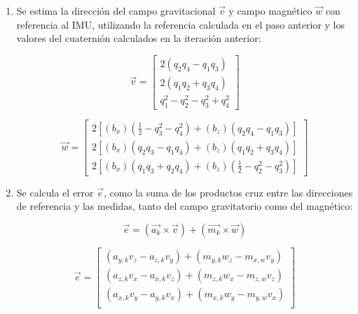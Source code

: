 \begin{enumerate}
        \item Se estima la dirección del campo gravitacional \textbf{\textit{$\vec{v}$}} y campo magnético \textbf{\textit{$\vec{w}$}} con referencia al IMU, utilizando la referencia calculada en el paso anterior y los valores del cuaternión calculados en la iteración anterior:
        
        \begin{equation}        
            \vec{v} = 
                \begin{bmatrix}
                    2(q_2q_4 - q_1q_3) \\
                    2(q_1q_2 + q_3q_4) \\
                    q^2_1 - q^2_2 - q^2_3 +q^2_4  
                \end{bmatrix} 
        \end{equation}

        \begin{equation}        
            \vec{w} = 
                \begin{bmatrix}
                    2[(b_x)(\frac{1}{2} - q^2_3 - q^2_4) + (b_z)(q_2q_4 - q_1q_3)] \\
                    2[(b_x)(q_2q_3 - q_1q_4) + (b_z)(q_1q_2 + q_3q_4)] \\
                    2[(b_x)(q_1q_3 + q_2q_4) + (b_z)(\frac{1}{2} - q^2_2 - q^2_3)] 
                \end{bmatrix} 
        \end{equation}

        \item Se calcula el error $\vec{e}$, como la suma de los productos cruz entre las direcciones de referencia y las medidas, tanto del campo gravitatorio como del magnético:
        
        \begin{equation}
            \vec{e} = (\vec{a_k} \times \vec{v}) + (\vec{m_k} \times \vec{w}) 
        \end{equation}
            
        \begin{equation}
            \vec{e} = 
                \begin{bmatrix}
                    (a_{y,k}v_z - a_{z,k}v_y) + (m_{y,k}w_z - m_{x,w}v_y) \\
                    (a_{z,k}v_x - a_{x,k}v_z) + (m_{z,k}w_x - m_{z,w}v_z) \\
                    (a_{x,k}v_y - a_{y,k}v_x) + (m_{x,k}w_y - m_{y,w}v_x) \\
                \end{bmatrix} 
        \end{equation}
            

\end{enumerate}

